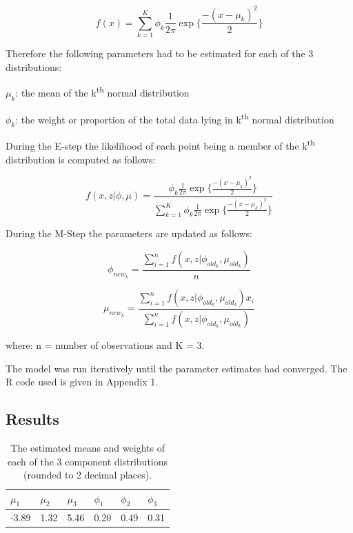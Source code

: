 \documentclass[a4paper, 10pt]{article}
\begin{document}
\[
f(x)= \sum_{k=1}^K\phi_k \frac{1}{2\pi}\exp\{\frac{-(x-\mu_k)^2}{2}  \}
\]

Therefore the following parameters had to be estimated for each of the 3 distributions:

$\mu_k$: the mean of the k\textsuperscript{th} normal distribution
 
$\phi_k$: the weight or proportion of the total data lying in  k\textsuperscript{th} normal distribution


 
During the E-step the likelihood of each point being a member of the k\textsuperscript{th} distribution is computed as follows:

\[
f(x,z|\phi, \mu)= \frac{\phi_k \frac{1}{2\pi}\exp\{\frac{-(x-\mu_k)^2}{2}  \}}{ \sum_{k=1}^K\phi_k \frac{1}{2\pi}\exp\{\frac{-(x-\mu_k)^2}{2}  \}}
\]
 
 During the M-Step the parameters are updated as follows:

\[
\phi_{new_k} = \frac{\sum_{i=1}^n f(x,z|\phi_{old_k}, \mu_{old_k})}{n}
\]

\[
\mu_{new_k} = \frac{\sum_{i=1}^n f(x,z|\phi_{old_k}, \mu_{old_k})x_i}{\sum_{i=1}^n f(x,z|\phi_{old_k}, \mu_{old_k})}
\]

where: n = number of observations and K = 3.
 
The model was run iteratively until the parameter estimates had converged. The R code used is given in Appendix 1.

\subsection{Results}

\begin{table}[ht]
\begin{center}
\begin{tabular}{llllll}
  \hline
 $\mu_1$ &  $\mu_2$ & $\mu_3$ & $\phi_1$ & $\phi_2$ & $\phi_3$\\ 
  \hline
-3.89 & 1.32 & 5.46 & 0.20 & 0.49 & 0.31 \\
  \hline
\end{tabular}
\caption{The estimated means and weights of each of the 3 component distributions (rounded to 2 decimal places).} 
\label{T:Times}
\end{center}
\end{table}
\end{document}
